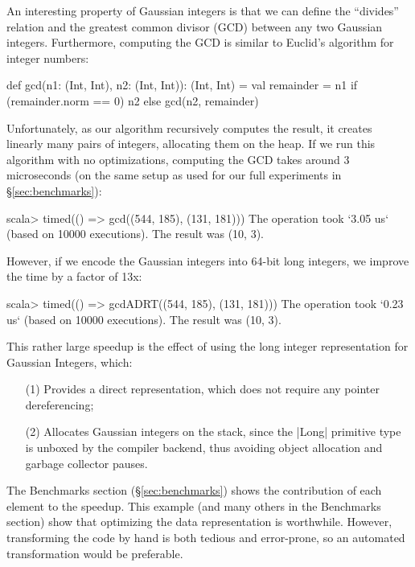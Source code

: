An interesting property of Gaussian integers is that we can define the
``divides'' relation and the greatest common divisor (GCD) between any
two Gaussian integers. Furthermore, computing the GCD is similar to
Euclid's algorithm for integer numbers:

\begin{lstlisting-nobreak}
def gcd(n1: (Int, Int), n2: (Int, Int)): (Int, Int) = {
  val remainder = n1 %
  if (remainder.norm == 0) n2 else gcd(n2, remainder)
}
\end{lstlisting-nobreak}

Unfortunately, as our algorithm recursively computes the result, it creates linearly many pairs of integers, allocating them on the heap. If we run this algorithm with no optimizations, computing the GCD takes around 3 microseconds (on the same setup as used for our full experiments in \S\ref{sec:benchmarks}):

\begin{lstlisting-nobreak}
scala> timed(() => gcd((544, 185), (131, 181)))
The operation took `3.05 us` (based on 10000 executions).
The result was (10, 3).
\end{lstlisting-nobreak}

However, if we encode the Gaussian integers into 64-bit long integers, we improve the time by a factor of 13x:

\begin{lstlisting-nobreak}
scala> timed(() => gcdADRT((544, 185), (131, 181)))
The operation took `0.23 us` (based on 10000 executions).
The result was (10, 3).
\end{lstlisting-nobreak}

This rather large speedup is the effect of using the long integer representation for Gaussian Integers, which:

\begin{itemize}
  \item[(1)] Provides a direct representation, which does not require any pointer dereferencing;
  \item[(2)] Allocates Gaussian integers on the stack, since the |Long| primitive type is unboxed by the compiler backend, thus avoiding object allocation and garbage collector pauses.
\end{itemize}

The Benchmarks section (\S\ref{sec:benchmarks}) shows the contribution of each element to the speedup. This example (and many others in the Benchmarks section) show that optimizing the data representation is worthwhile. However, transforming the code by hand is both tedious and error-prone, so an automated transformation would be preferable.


